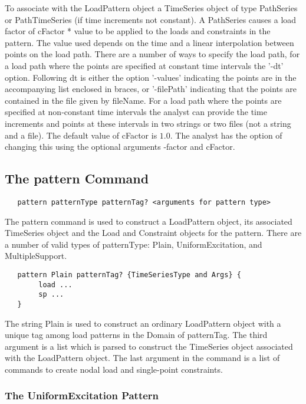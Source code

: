 \documentclass[12pt]{article}
\begin{document}
\noindent To associate with the LoadPattern object a TimeSeries object
of type PathSeries or PathTimeSeries (if time increments not
constant). A PathSeries causes a load factor of cFactor * 
value to be applied to the loads and constraints in the pattern. The value used
depends on the time and a linear interpolation between points on the
load path. There are a number of ways to specify the load path, for a load
path where the points are specified at constant time intervals the
'-dt' option. Following dt is either the option '-values' indicating the
points are in the accompanying list enclosed in braces, or '-filePath'
indicating that the points are contained in the file given by
fileName. For a load path where the points are specified at
non-constant time intervals the analyst can provide the time
increments and points at these intervals in two strings or two files
(not a string and a file). The default value of cFactor is $1.0$. The
analyst has the option of changing this using the optional arguments
-factor and cFactor. 

\subsection{The pattern Command}
{\sf\small
\begin{verbatim}
   pattern patternType patternTag? <arguments for pattern type>
\end{verbatim}
}

The pattern command is used to construct a LoadPattern object, its
associated TimeSeries object and the Load and Constraint objects for
the pattern. There are a number of valid types of patternType: Plain,
UniformExcitation, and MultipleSupport.

{\sf\small
\begin{verbatim}
   pattern Plain patternTag? {TimeSeriesType and Args} {
        load ...
        sp ...
   }	
\end{verbatim}
}

\noindent The string Plain is used to construct an ordinary
LoadPattern object with a unique tag among load patterns in the Domain
of patternTag. The third argument is a list which is parsed to
construct the TimeSeries object associated with the LoadPattern
object. The last argument in the command is a list of commands to
create nodal load and single-point constraints.



\subsubsection{The UniformExcitation Pattern}
\end{document}
